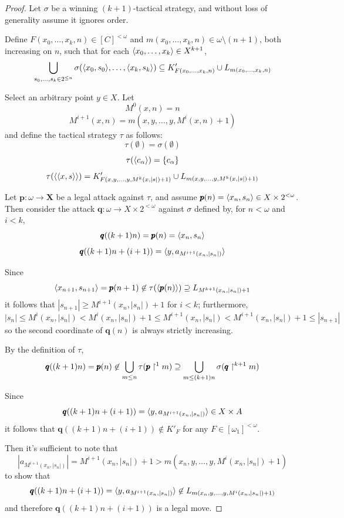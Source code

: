 \documentclass{amsart}
\theoremstyle{definition}
\begin{document}
\begin{proof}
  Let $\sigma$ be a winning $(k+1)$-tactical strategy, and without loss of
  generality assume it ignores order.

  Define $F(x_0,\dots,x_{k},n)\in [C]^{<\omega}$ and
  $m(x_0,\dots,x_{k},n)\in\omega\setminus(n+1)$, both increasing on $n$,
  such that for each $\langle x_0,\dots,x_{k}\rangle\in X^{k+1}$,
  \[
    \bigcup_{s_0,\dots,s_k \in 2^{\leq n}}
    \sigma(\langle x_0,s_0\rangle,\dots,\langle x_{k},s_{k}\rangle)
      \subseteq
    K'_{F(x_0,\dots,x_{k},n)} \cup L_{m(x_0,\dots,x_{k},n)}
  \]

  Select an arbitrary point $y \in X$.
  Let
    \[
      M^0(x,n)=n
    \]
    \[
      M^{i+1}(x,n)=m(x,y,\dots,y,M^i(x,n)+1)
    \]
  and define the tactical strategy $\tau$ as follows:
  \[
    \tau(\emptyset)
      =
    \sigma(\emptyset)
  \]
  \[
    \tau(\langle c_\alpha\rangle)
      =
    \{c_\alpha\}
  \]
  \[
    \tau(\langle\langle x,s\rangle\rangle)
      =
    K'_{F(x,y,\dots,y,M^k(x,|s|)+1)}
      \cup
    L_{m(x,y,\dots,y,M^k(x,|s|)+1)}
  \]

  Let $\pmb p:\omega\to \pmb X$ be a legal attack against
  $\tau$, and assume $\pmb p(n)=\langle x_n,s_n\rangle\in X\times 2^{<\omega}$.
  Then consider the attack $\pmb q:\omega\to X\times 2^{<\omega}$ against
  $\sigma$ defined by, for $n<\omega$ and $i<k$,
    \[
      \pmb q((k+1)n)=\pmb p(n)=\langle x_n,s_n\rangle
    \]
    \[
      \pmb q((k+1)n+(i+1))=\langle y, a_{M^{i+1}(x_n,|s_n|)}\rangle
    \]

  Since
    \[
      \langle x_{n+1},s_{n+1}\rangle
        =
      \pmb p(n+1)
        \not\in
      \tau(\langle\pmb p(n)\rangle)
        \supseteq
      L_{M^{k+1}(x_n,|s_n|)+1}
    \]
  it follows that
  $|s_{n+1}|\geq M^{i+1}(x_n,|s_n|)+1$ for $i<k$; furthermore,
    \[
      |s_n|
        \leq
      M^i(x_n,|s_n|)
        <
      M^i(x_n,|s_n|)+1
        \leq
      M^{i+1}(x_n,|s_n|)
        <
      M^{i+1}(x_n,|s_n|)+1
        \leq
      |s_{n+1}|
    \]
  so the second coordinate of $\pmb q(n)$ is always strictly increasing.

  By the definition of $\tau$,
    \[
      \pmb q((k+1)n)
        =
      \pmb p(n)
        \not\in
      \bigcup_{m\leq n}
      \tau(\pmb p\restriction^1 m)
        \supseteq
      \bigcup_{m\leq (k+1)n}
      \sigma(\pmb q\restriction^{k+1} m)
    \]

  Since
    \[
      \pmb q((k+1)n+(i+1))
        =
      \langle y, a_{M^{i+1}(x_n,|s_n|)}\rangle
        \in
      X\times A
    \]
  it follows that $\pmb q((k+1)n+(i+1))\not\in K'_F$ for any
  $F\in[\omega_1]^{<\omega}$.

  Then it's sufficient to note that
    \[
      |a_{M^{i+1}(x_n,|s_n|)}|
        =
      M^{i+1}(x_n,|s_n|) + 1
        >
      m(x_n,y,\dots,y,M^i(x_n,|s_n|)+1)
    \]
  to show that
    \[
      \pmb q((k+1)n+(i+1))
        =
      \langle y, a_{M^{i+1}(x_n,|s_n|)}\rangle
        \not\in
      L_{m(x_n,y,\dots,y,M^i(x_n,|s_n|)+1)}
    \]
  and therefore $\pmb q((k+1)n+(i+1))$ is a legal move.


\end{proof}
\end{document}
